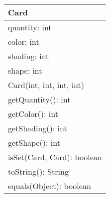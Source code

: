 \documentclass[11pt]{article}
\begin{document}
\begin{tabular}{|l|}
\hline
Card \\
\hline
quantity: int \\
color: int \\
shading: int \\
shape: int \\
\hline
Card(int, int, int, int) \\
getQuantity(): int \\
getColor(): int \\
getShading(): int \\
getShape(): int\\
isSet(Card, Card): boolean\\
toString(): String \\
equals(Object): boolean\\
\hline
\end{tabular}
\end{document}

